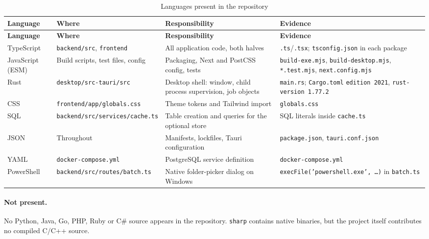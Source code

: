 \documentclass[11pt,a4paper]{report}
\newcommand{\code}[1]{\texttt{\small #1}}
\DeclareRobustCommand{\file}[1]{{\small\nolinkurl{#1}}}
\begin{document}
\begin{longtable}{@{}>{\raggedright\arraybackslash}p{2.6cm}>{\raggedright\arraybackslash}p{3.4cm}>{\raggedright\arraybackslash}p{4.6cm}>{\raggedright\arraybackslash}p{4.4cm}@{}}
\caption{Languages present in the repository}\label{tab:languages}\\
\toprule
\textbf{Language} & \textbf{Where} & \textbf{Responsibility} & \textbf{Evidence}\\
\midrule
\endfirsthead
\toprule
\textbf{Language} & \textbf{Where} & \textbf{Responsibility} & \textbf{Evidence}\\
\midrule
\endhead
\bottomrule
\endfoot
TypeScript & \file{backend/src}, \file{frontend} & All application code, both halves &
\file{.ts}/\file{.tsx}; \file{tsconfig.json} in each package\\
JavaScript (ESM) & Build scripts, test files, config &
Packaging, Next and PostCSS config, tests &
\file{build-exe.mjs}, \file{build-desktop.mjs}, \file{*.test.mjs}, \file{next.config.mjs}\\
Rust & \file{desktop/src-tauri/src} & Desktop shell: window, child process supervision, job objects &
\file{main.rs}; \file{Cargo.toml} \code{edition 2021}, \code{rust-version 1.77.2}\\
CSS & \file{frontend/app/globals.css} & Theme tokens and Tailwind import & \file{globals.css}\\
SQL & \file{backend/src/services/cache.ts} & Table creation and queries for the optional store &
SQL literals inside \file{cache.ts}\\
JSON & Throughout & Manifests, lockfiles, Tauri configuration & \file{package.json}, \file{tauri.conf.json}\\
YAML & \file{docker-compose.yml} & PostgreSQL service definition & \file{docker-compose.yml}\\
PowerShell & \file{backend/src/routes/batch.ts} & Native folder-picker dialog on Windows &
\code{execFile('powershell.exe', \ldots)} in \file{batch.ts}\\
\end{longtable}

\paragraph{Not present.} No Python, Java, Go, PHP, Ruby or C\# source appears in
the repository. \code{sharp} contains native binaries, but the project itself
contributes no compiled C/C++ source.

\end{document}
